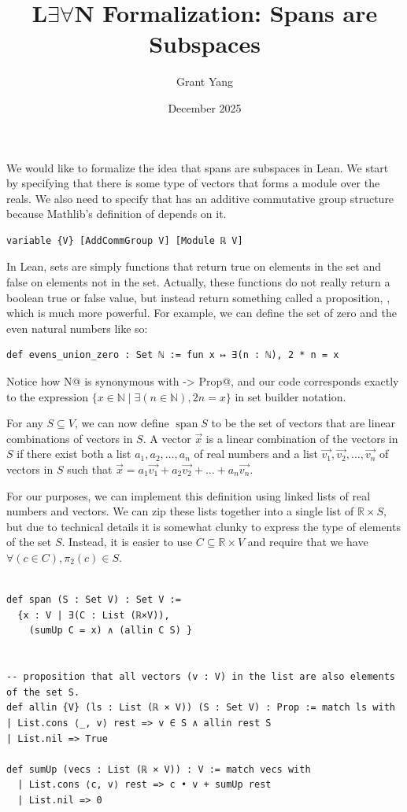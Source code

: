 \documentclass{article}
\title{L$\exists \forall$N Formalization: Spans are Subspaces}
\author{Grant Yang}
\date{December 2025}
\DeclareMathOperator{\spann}{span}
\begin{document}
\maketitle

We would like to formalize the idea that spans are subspaces in Lean. We start by specifying that there is some type \lstinline@V@ of vectors that forms a module over the reals. We also need to specify that \lstinline@V@ has an additive commutative group structure because Mathlib's definition of \lstinline@Module@ depends on it.

\begin{lstlisting}
variable {V} [AddCommGroup V] [Module ℝ V]
\end{lstlisting}

In Lean, sets are simply functions that return true on elements in the set and false on elements not in the set. Actually, these functions do not really return a boolean true or false value, but instead return something called a proposition, \lstinline@Prop@, which is much more powerful. For example, we can define the set of zero and the even natural numbers like so:

\begin{lstlisting}
def evens_union_zero : Set ℕ := fun x ↦ ∃(n : ℕ), 2 * n = x
\end{lstlisting}

Notice how \lstinline@Set N@ is synonymous with \lstinline@N -> Prop@, and our code corresponds exactly to the expression $\{x\in \mathbb{N} \mid \exists(n\in \mathbb N), 2n=x\}$ in set builder notation. 

For any $S \subseteq V$, we can now define $\spann S$ to be the set of vectors that are linear combinations of vectors in $S$. A vector $\vec{x}$ is a linear combination of the vectors in $S$ if there exist both a list $a_1,a_2,\dots,a_n$ of real numbers and a list $\vec{v_1},\vec{v_2},\dots,\vec{v_n}$ of vectors in $S$ such that $\vec{x}=a_1 \vec{v_1} + a_2 \vec{v_2}+\dots+ a_n \vec{v_n}$.

For our purposes, we can implement this definition using linked lists of real numbers and vectors. We can zip these lists together into a single list of $\mathbb{R} \times S$, but due to technical details it is somewhat clunky to express the type of elements of the set $S$. Instead, it is easier to use $C \subseteq \mathbb{R}\times V$ and require that we have $\forall (c \in C), \pi_2(c)\in S$.

\begin{lstlisting}

def span (S : Set V) : Set V :=
  {x : V | ∃(C : List (ℝ×V)),
    (sumUp C = x) ∧ (allin C S) }


-- proposition that all vectors (v : V) in the list are also elements of the set S.
def allin {V} (ls : List (ℝ × V)) (S : Set V) : Prop := match ls with
| List.cons ⟨_, v⟩ rest => v ∈ S ∧ allin rest S
| List.nil => True

def sumUp (vecs : List (ℝ × V)) : V := match vecs with
  | List.cons ⟨c, v⟩ rest => c • v + sumUp rest
  | List.nil => 0

\end{lstlisting}
\end{document}
